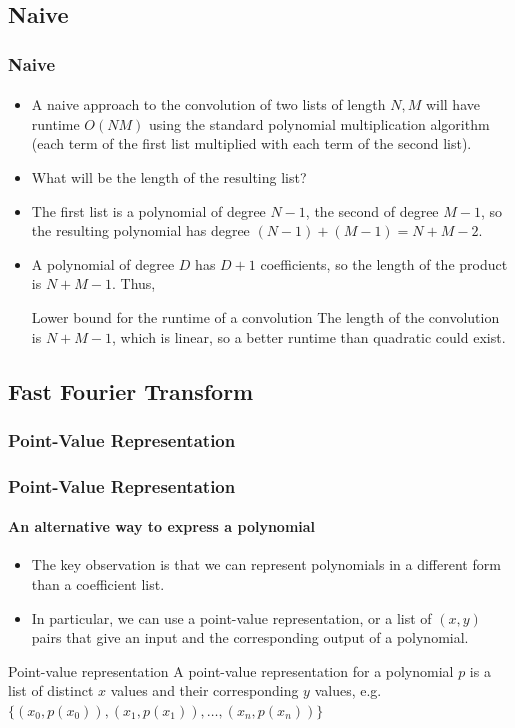 \documentclass{beamer}                             %
\begin{document}
\subsection{Naive}
\begin{frame}
\frametitle{Naive}
\framesubtitle{}
\begin{itemize}[<+->]
  \item A naive approach to the convolution of two lists of length \(
    N, M \) will have runtime \( O(NM) \) using the standard polynomial
    multiplication algorithm (each term of the first list multiplied with
    each term of the second list).
  \item What will be the length of the resulting list?
  \item The first list is a polynomial of degree \( N - 1 \),
    the second of degree \( M - 1 \), so the resulting polynomial
    has degree \( (N - 1) + (M - 1) = N + M - 2 \).
  \item A polynomial of degree \( D \) has \( D + 1 \) coefficients, 
    so the length of the product is \( N + M - 1 \). Thus,
    \begin{block}{Lower bound for the runtime of a convolution}
      The length of the convolution is \( N + M - 1 \), which is linear,
      so a better runtime than quadratic could exist. 
    \end{block}
\end{itemize}
\end{frame}

\subsection[FTT]{Fast Fourier Transform}
\subsubsection[Point-Value]{Point-Value Representation}
\begin{frame}
\frametitle{Point-Value Representation}
\framesubtitle{An alternative way to express a polynomial}
\begin{itemize}
  \item The key observation is that we can represent
    polynomials in a different form than a coefficient list.
  \item In particular, we can use a \alert{point-value}
    representation, or a list of \( (x, y) \) pairs that give
    an input and the corresponding output of a polynomial.
\end{itemize}
\begin{alertblock}{Point-value representation}
  A point-value representation for a polynomial \( p \) is a list of distinct
  \( x \) values and their corresponding \( y \) values, e.g.
  \( \{(x_0, p(x_0)), (x_1, p(x_1)), \ldots, (x_n, p(x_n)) \}  \)
\end{alertblock}
\end{frame}
\end{document}
